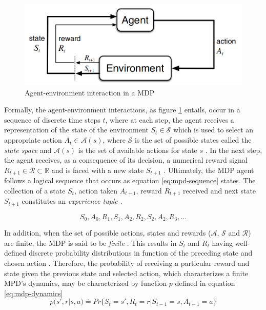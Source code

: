 \begin{figure}
	\centering
	\includegraphics[width=0.75\linewidth]{./figures/mpd.png}
	\caption{Agent-environment interaction in a \acs{MDP}  \cite{suttonReinforcementLearningIntroduction2014}}
	\label{fig:mpd-interaction}
\end{figure}

Formally, the agent-environment interactions, as figure \ref{fig:mpd-interaction} entails, occur in a sequence of discrete time steps $t$, where at each step, the agent receives a representation of the state of the environment $S_t \in \mathcal{S}$ which is used to select an appropriate action $A_t \in \mathcal{A}(s)$, where $\mathcal{S}$ is the set of possible states called the \textit{state space} and $\mathcal{A}(s)$ is the set of available actions for state $s$ \cite{suttonReinforcementLearningIntroduction2014, moralesGrokkingDeepReinforcement2020}. In the next step, the agent receives, as a consequence of its decision, a numerical reward signal $R_{t+1} \in \mathcal{R} \subset \mathbb{R}$ and is faced with a new state $S_{t +1}$ \cite{suttonReinforcementLearningIntroduction2014}. Ultimately, the MDP agent follows a logical sequence that occurs as equation \ref{eq:mpd-sequence} states. The collection of a state $S_t$, action taken $A_{t+1}$, reward $R_{t+1}$ received and next state $S_{t+1}$ constitutes an \textit{experience tuple} \cite{moralesGrokkingDeepReinforcement2020}.

\begin{equation} \label{eq:mpd-sequence}
	S_0, A_0, R_1, S_1, A_2, R_2, S_2, A_2, R_3, \dots
\end{equation}

In addition, when the set of possible actions, states and rewards ($\mathcal{A}$, $\mathcal{S}$ and $\mathcal{R}$) are finite, the \ac{MDP} is said to be \textit{finite} \cite{suttonReinforcementLearningIntroduction2014}. This results in $S_t$ and $R_t$ having well-defined discrete probability distributions in function of the preceding state and chosen action \cite{suttonReinforcementLearningIntroduction2014}. Therefore, the probability of receiving a particular reward and state given the previous state and selected action, which characterizes a finite MPD's dynamics, may be characterized by function $p$ defined in equation \ref{eq:mdp-dynamics}
\begin{equation} \label{eq:mdp-dynamics}
	p(s',r|s,a) \doteq Pr\{S_t = s', R_t = r | S_{t-1} = s, A_{t-1} = a\}
\end{equation}

